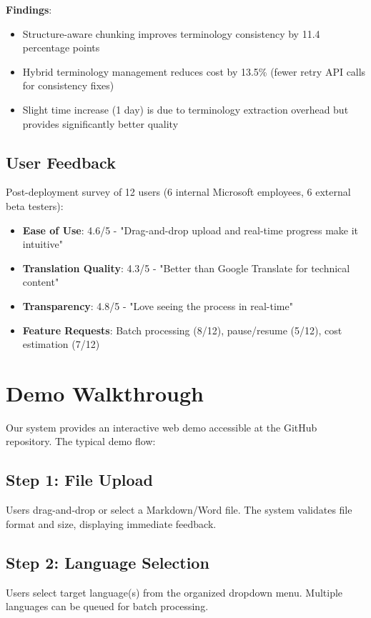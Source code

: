 \documentclass[11pt]{article}
\begin{document}
\textbf{Findings}:
\begin{itemize}
    \item Structure-aware chunking improves terminology consistency by 11.4 percentage points
    \item Hybrid terminology management reduces cost by 13.5\% (fewer retry API calls for consistency fixes)
    \item Slight time increase (1 day) is due to terminology extraction overhead but provides significantly better quality
\end{itemize}

\subsection{User Feedback}

Post-deployment survey of 12 users (6 internal Microsoft employees, 6 external beta testers):

\begin{itemize}
    \item \textbf{Ease of Use}: 4.6/5 - "Drag-and-drop upload and real-time progress make it intuitive"
    \item \textbf{Translation Quality}: 4.3/5 - "Better than Google Translate for technical content"
    \item \textbf{Transparency}: 4.8/5 - "Love seeing the process in real-time"
    \item \textbf{Feature Requests}: Batch processing (8/12), pause/resume (5/12), cost estimation (7/12)
\end{itemize}

\section{Demo Walkthrough}

Our system provides an interactive web demo accessible at the GitHub repository. The typical demo flow:

\subsection{Step 1: File Upload}
Users drag-and-drop or select a Markdown/Word file. The system validates file format and size, displaying immediate feedback.

\subsection{Step 2: Language Selection}
Users select target language(s) from the organized dropdown menu. Multiple languages can be queued for batch processing.
\end{document}
